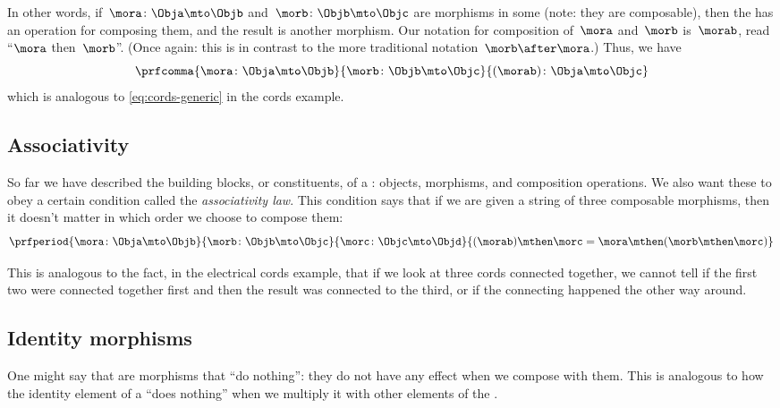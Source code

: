 In other words, if~$\mora\colon \Obja \mto \Objb$ and~$\morb\colon \Objb \mto \Objc$ are morphisms in some  (note: they are composable), then the  has an operation for composing them, and the result is another morphism.
Our notation for composition of~$\mora$ and~$\morb$ is~$\morab$, read ``$\mora$ then~$\morb$''.
(Once again: this is in contrast to the more traditional notation~$\morb \after \mora$.)
Thus, we have
\begin{equation}
    \prfcomma{
        \mora \colon \Obja \mto \Objb
    }{
        \morb\colon \Objb \mto \Objc
    }{
        (\morab )\colon \Obja \mto \Objc
    }
\end{equation}
which is analogous to \cref{eq:cords-generic} in the cords example.


\subsection{Associativity}

So far we have described the building blocks, or constituents, of a : objects, morphisms, and composition operations.
We also want these to obey a certain condition called the \emph{associativity law}.
This condition says that if we are given a string of three composable morphisms, then it doesn't matter in which order we choose to compose them:
\begin{equation}
    \prfperiod{
        \mora \colon \Obja \mto \Objb
    }{
        \morb\colon \Objb \mto \Objc
    }{
        \morc \colon \Objc \mto \Objd
    }{
        (\morab ) \mthen \morc = \mora \mthen ( \morb \mthen \morc )
    }
\end{equation}

This is analogous to the fact, in the electrical cords example, that if we look at three cords connected together, we cannot tell if the first two were connected together first and then the result was connected to the third, or if the connecting happened the other way around.


\subsection{Identity morphisms}

One might say that  are morphisms that ``do nothing'': they do not have any effect when we compose with them.
This is analogous to how the identity element of a  ``does nothing'' when we multiply it with other elements of the .

